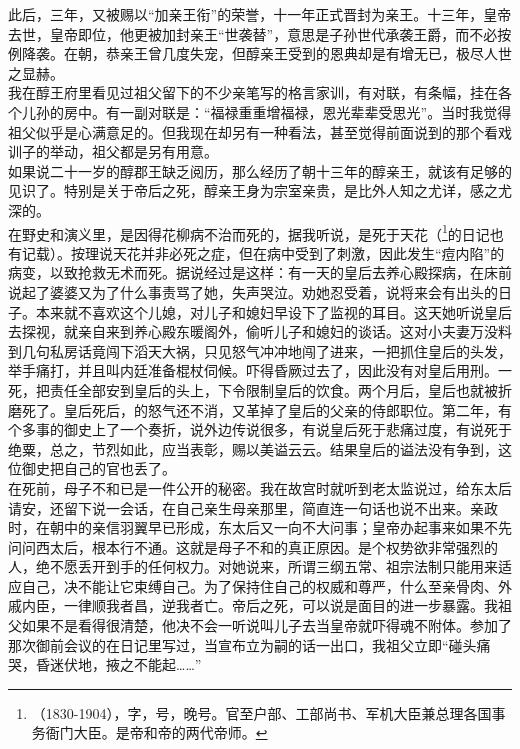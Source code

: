 此后，三年，又被赐以“加亲王衔”的荣誉，十一年正式晋封为亲王。十三年，皇帝去世，皇帝即位，他更被加封亲王“世袭替”，意思是子孙世代承袭王爵，而不必按例降袭。在朝，恭亲王曾几度失宠，但醇亲王受到的恩典却是有增无已，极尽人世之显赫。\\

我在醇王府里看见过祖父留下的不少亲笔写的格言家训，有对联，有条幅，挂在各个儿孙的房中。有一副对联是：“福禄重重增福禄，恩光辈辈受思光”。当时我觉得祖父似乎是心满意足的。但我现在却另有一种看法，甚至觉得前面说到的那个看戏训子的举动，祖父都是另有用意。\\

如果说二十一岁的醇郡王缺乏阅历，那么经历了朝十三年的醇亲王，就该有足够的见识了。特别是关于帝后之死，醇亲王身为宗室亲贵，是比外人知之尤详，感之尤深的。\\

在野史和演义里，是因得花柳病不治而死的，据我听说，是死于天花（\footnote{（1830-1904），字，号，晚号。官至户部、工部尚书、军机大臣兼总理各国事务衙门大臣。是帝和帝的两代帝师。}的日记也有记载）。按理说天花并非必死之症，但在病中受到了刺激，因此发生“痘内陷”的病变，以致抢救无术而死。据说经过是这样：有一天的皇后去养心殿探病，在床前说起了婆婆又为了什么事责骂了她，失声哭泣。劝她忍受着，说将来会有出头的日子。本来就不喜欢这个儿媳，对儿子和媳妇早设下了监视的耳目。这天她听说皇后去探视，就亲自来到养心殿东暖阁外，偷听儿子和媳妇的谈话。这对小夫妻万没料到几句私房话竟闯下滔天大祸，只见怒气冲冲地闯了进来，一把抓住皇后的头发，举手痛打，并且叫内廷准备棍杖伺候。吓得昏厥过去了，因此没有对皇后用刑。一死，把责任全部安到皇后的头上，下令限制皇后的饮食。两个月后，皇后也就被折磨死了。皇后死后，的怒气还不消，又革掉了皇后的父亲的侍郎职位。第二年，有个多事的御史上了一个奏折，说外边传说很多，有说皇后死于悲痛过度，有说死于绝粟，总之，节烈如此，应当表彰，赐以美谥云云。结果皇后的谥法没有争到，这位御史把自己的官也丢了。\\

在死前，母子不和已是一件公开的秘密。我在故宫时就听到老太监说过，给东太后请安，还留下说一会话，在自己亲生母亲那里，简直连一句话也说不出来。亲政时，在朝中的亲信羽翼早已形成，东太后又一向不大问事；皇帝办起事来如果不先问问西太后，根本行不通。这就是母子不和的真正原因。是个权势欲非常强烈的人，绝不愿丢开到手的任何权力。对她说来，所谓三纲五常、祖宗法制只能用来适应自己，决不能让它束缚自己。为了保持住自己的权威和尊严，什么至亲骨肉、外戚内臣，一律顺我者昌，逆我者亡。帝后之死，可以说是面目的进一步暴露。我祖父如果不是看得很清楚，他决不会一听说叫儿子去当皇帝就吓得魂不附体。参加了那次御前会议的在日记里写过，当宣布立为嗣的话一出口，我祖父立即“碰头痛哭，昏迷伏地，掖之不能起……”\\

